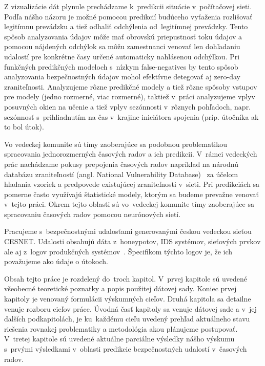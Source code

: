 \documentclass[thesismargins, thesislinespacing, openright, upjsfrontpage]{rnthesis}
\begin{document}
Z vizualizácie dát plynule prechádzame k~predikcii situácie v~počítačovej sieti. Podľa nášho názoru je možné pomocou predikcií budúceho vyťaženia rozlišovať legitímnu prevádzku a tiež odhaliť odchýlenia od~legitímnej prevádzky. Tento spôsob analyzovania údajov môže mať obrovskú priepustnosť toku údajov a pomocou nájdených odchýlok sa môžu zamestnanci venovať len dohľadaniu udalostí pre konkrétne časy určené automaticky nahlásenou odchýlkou. Pri funkčných predikčných modeloch s~nízkym false-negatives by tento spôsob analyzovania bezpečnostných údajov mohol efektívne detegovať aj zero-day zraniteľnosti. Analyzujeme rôzne predikčné modely a tiež rôzne spôsoby vstupov pre modely (jedno rozmerné, viac rozmerné), taktiež v~práci analyzujeme vplyv posuvných okien na učenie a tiež vplyv sezónnosti v~rôznych pohľadoch, napr. sezónnosť s~prihliadnutím na čas v~krajine iniciátora spojenia (príp. útočníka ak to bol útok).

Vo vedeckej komunite sú tímy zaoberajúce sa podobnou problematikou spracovania jednorozmerných časových radov a ich predikcii. V~rámci vedeckých prác nachádzame pokusy prepojenia časových radov napríklad na národnú databázu zraniteľností (angl. National Vulnerability Database)~\cite{roumani2015time} za účelom hľadania vzoriek a predpovede existujúcej zraniteľnosti v~sieti. Pri predikciách sa pomerne často využívajú štatistické modely, ktorým sa budeme prevažne venovať v~tejto práci. Okrem tejto oblasti sú vo~vedeckej komunite tímy zaoberajúce sa spracovaniu časových radov pomocou neurónových sietí.

Pracujeme s~bezpečnostnými udalosťami generovanými českou vedeckou sieťou CESNET. Udalosti obsahujú dáta z~honeypotov, IDS systémov, sieťových prvkov ale aj z~logov produkčných systémov~\cite{kacha2015warden}. Špecifikom týchto logov je, že ich považujeme ako údaje o útokoch.

Obsah tejto práce je rozdelený do~troch kapitol. V~prvej kapitole sú uvedené všeobecné teoretické poznatky a popis použitej dátovej sady. Koniec prvej kapitoly je venovaný formulácii výskumných cieľov. Druhá kapitola sa detailne venuje rozboru cieľov práce. Úvodná časť kapitoly sa venuje dátovej sade a v~jej ďalších podkapitolách, je ku~každému cieľu uvedený prehľad aktuálneho stavu riešenia rovnakej problematiky a metodológia akou plánujeme postupovať. V~tretej kapitole sú uvedené aktuálne parciálne výsledky nášho výskumu s~prvými výsledkami v~oblasti predikcie bezpečnostných udalostí v~časových radov.

 
\end{document}
